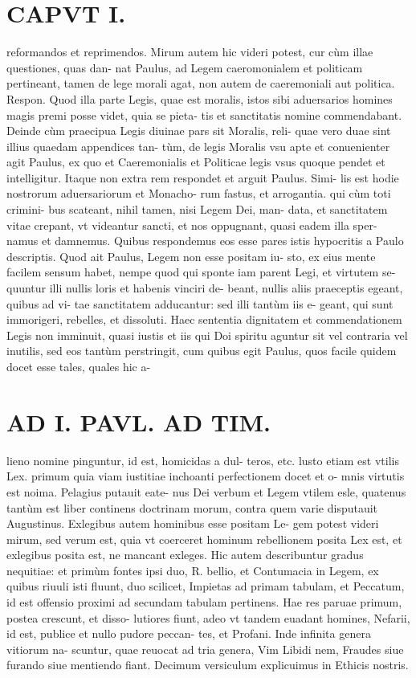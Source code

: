 \documentclass{article}
\begin{document}
\begin{pages}
\section*{CAPVT  I. }
\marginpar{[ p.21 ]}\pstart reformandos et reprimendos. Mirum autem hic videri potest, cur cùm illae questiones, quas dan- nat Paulus, ad Legem caeromonialem et politicam pertineant, tamen de lege morali agat, non autem de caeremoniali aut politica. Respon. Quod illa parte Legis, quae est moralis, istos sibi aduersarios homines magis premi posse videt, quia se pieta- tis et sanctitatis nomine commendabant. Deinde cùm praecipua Legis diuinae pars sit Moralis, reli- quae vero duae sint illius quaedam appendices tan- tùm, de legis Moralis vsu apte et conuenienter agit Paulus, ex quo et Caeremonialis et Politicae legis vsus quoque pendet et intelligitur. Itaque non extra rem respondet et arguit Paulus. Simi- lis est hodie nostrorum aduersariorum et Monacho- rum fastus, et arrogantia. qui cùm toti crimini- bus scateant, nihil tamen, nisi Legem Dei, man- data, et sanctitatem vitae crepant, vt videantur sancti, et nos oppugnant, quasi eadem illa sper- namus et damnemus. Quibus respondemus eos esse pares istis hypocritis a Paulo descriptis. Quod ait Paulus, Legem non esse positam iu- sto, ex eius mente facilem sensum habet, nempe quod qui sponte iam parent Legi, et virtutem se- quuntur illi nullis loris et habenis vinciri de- beant, nullis aliis praeceptis egeant, quibus ad vi- tae sanctitatem adducantur: sed illi tantùm iis e- geant, qui sunt immorigeri, rebelles, et dissoluti. Haec sententia dignitatem et commendationem Legis non imminuit, quasi iustis et iis qui Doi spiritu aguntur sit vel contraria vel inutilis, sed eos tantùm perstringit, cum quibus egit Paulus, quos facile quidem docet esse tales, quales hic a-  \pend
\section*{AD I. PAVL. AD TIM. }
\marginpar{[ p.22 ]}\pstart lieno nomine pinguntur, id est, homicidas a dul- teros, etc. lusto etiam est vtilis Lex. primum quia viam iustitiae inchoanti perfectionem docet et o- mnis virtutis est noima. Pelagius putauit eate- nus Dei verbum et Legem vtilem esle, quatenus tantùm est liber continens doctrinam morum, contra quem varie disputauit Augustinus.  \pend\pstart Exlegibus autem hominibus esse positam Le- gem potest videri mirum, sed verum est, quia vt coerceret hominum rebellionem posita Lex est, et exlegibus posita est, ne mancant exleges.  \pend\pstart Hic autem describuntur gradus nequitiae: et primùm fontes ipsi duo, R. bellio, et Contumacia in Legem, ex quibus riuuli isti fluunt, duo scilicet, Impietas ad primam tabulam, et Peccatum, id est offensio proximi ad secundam tabulam pertinens. Hae res paruae primum, postea crescunt, et disso- lutiores fiunt, adeo vt tandem euadant homines, Nefarii, id est, publice et nullo pudore peccan- tes, et Profani. Inde infinita genera vitiorum na- scuntur, quae reuocat ad tria genera, Vim Libidi nem, Fraudes siue furando siue mentiendo fiant. Decimum versiculum explicuimus in Ethicis nostris.  \pend
{}
{}

\end{pages}
\end{document}
